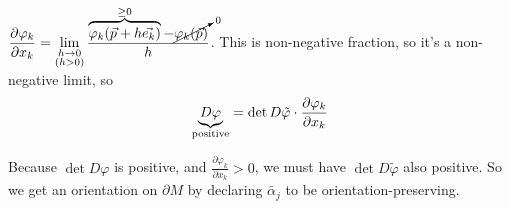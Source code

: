 \documentclass[10pt,letterpaper]{article}
\newcommand{\n}{\hfill\break}
\newcommand{\ptxt}[1]{\textrm{\textnormal{#1}}}
\let\deg\relax
\DeclareMathOperator{\deg}{deg}
\begin{document}
\par\noindent $\displaystyle\frac{\partial\varphi_{k}}{\partial{}x_{k}}=\lim_{\substack{h\to{}0\\ (h>0)}}\frac{\overbrace{\varphi_{k}(\vec{p}+h\vec{e_{k}})}^{\ge{}0}-\cancelto{0}{\varphi_{k}(\vec{p})}}{h}$. This is non-negative fraction, so it's a non-negative limit, so
\[
\underbrace{\deg{}D\varphi}_{\ptxt{positive}}=\det{}D\tilde{\varphi}\cdot\frac{\partial\varphi_{k}}{\partial{}x_{k}}
\]

\par\noindent Because $\det{}D\varphi$ is positive, and $\frac{\partial\varphi_{k}}{\partial{}x_{k}}>0$, we must have $\det{}D\tilde{\varphi}$ also positive.\n
So we get an orientation on $\partial{}M$ by declaring $\tilde{\alpha_{j}}$ to be orientation-preserving.
\end{document}
